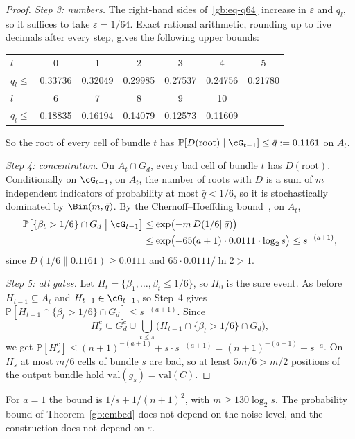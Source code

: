 \documentclass[11pt]{amsart}
\theoremstyle{definition}
\theoremstyle{remark}
\newcommand{\eps}{\varepsilon}
\newcommand{\val}{\mathrm{val}}
\newcommand{\PP}{\mathbb{P}}
\begin{document}
\begin{proof}
\emph{Step 3: numbers.} The right-hand sides of~\eqref{gb:eq-q64} increase
in $\eps$ and $q_l$, so it suffices to take $\eps=1/64$. Exact rational
arithmetic, rounding up to five decimals after every step, gives the
following upper bounds:
\begin{center}
\begin{tabular}{@{}lcccccc@{}}
\toprule
$l$ & 0 & 1 & 2 & 3 & 4 & 5\\
$q_l\le$ & 0.33736 & 0.32049 & 0.29985 & 0.27537 & 0.24756 & 0.21780\\
\midrule
$l$ & 6 & 7 & 8 & 9 & 10 & \\
$q_l\le$ & 0.18835 & 0.16194 & 0.14079 & 0.12573 & 0.11609 & \\
\bottomrule
\end{tabular}
\end{center}
So the root of every cell of bundle $t$ has
$\PP[D(\mathrm{root})\mid\cG_{t-1}]\le\bar q:=0.1161$ on $A_t$.

\emph{Step 4: concentration.} On $A_t\cap G_d$, every bad cell of bundle $t$
has $D(\mathrm{root})$. Conditionally on $\cG_{t-1}$, on $A_t$, the number
of roots with $D$ is a sum of $m$ independent indicators of probability at
most $\bar q<1/6$, so it is stochastically dominated by $\Bin(m,\bar q)$.
By the Chernoff--Hoeffding bound~\cite{hoeffding}, on $A_t$,
\begin{align*}
\PP\bigl[\{\beta_t>1/6\}\cap G_d\bigm|\cG_{t-1}\bigr]
&\le\exp\bigl(-m\,D(1/6\|\bar q)\bigr)\\
&\le\exp\bigl(-65(a+1)\cdot0.0111\cdot\log_2 s\bigr)\le s^{-(a+1)},
\end{align*}
since $D(1/6\|0.1161)\ge0.0111$ and $65\cdot0.0111/\ln2>1$.

\emph{Step 5: all gates.} Let $H_t=\{\beta_1,\dots,\beta_t\le1/6\}$, so
$H_0$ is the sure event. As before $H_{t-1}\subseteq A_t$ and
$H_{t-1}\in\cG_{t-1}$, so Step~4 gives
$\PP[H_{t-1}\cap\{\beta_t>1/6\}\cap G_d]\le s^{-(a+1)}$. Since
\[
H_s^c\subseteq G_d^c\cup\bigcup_{t\le s}\bigl(H_{t-1}\cap\{\beta_t>1/6\}\cap
G_d\bigr),
\]
we get $\PP[H_s^c]\le(n+1)^{-(a+1)}+s\cdot s^{-(a+1)}
=(n+1)^{-(a+1)}+s^{-a}$. On $H_s$ at most $m/6$ cells of bundle $s$ are
bad, so at least $5m/6>m/2$ positions of the output bundle hold
$\val(g_s)=\val(C)$.
\end{proof}

For $a=1$ the bound is $1/s+1/(n+1)^2$, with $m\ge130\log_2 s$. The
probability bound of Theorem~\ref{gb:embed} does not depend on the noise
level, and the construction does not depend on $\eps$.
\end{document}
